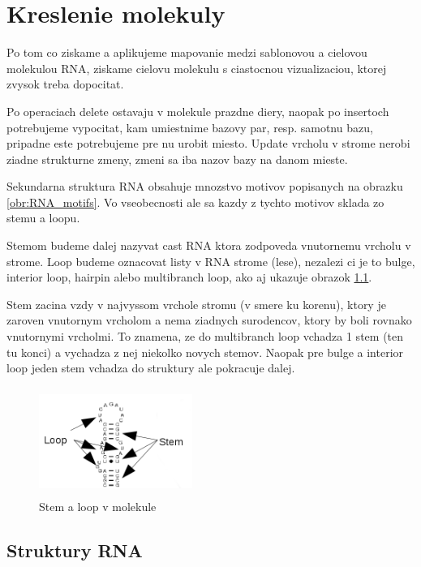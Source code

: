 
\newcommand{\degree}{\ensuremath{^{\circ}}}

\chapter{Kreslenie molekuly}

Po tom co ziskame a aplikujeme mapovanie medzi sablonovou a cielovou molekulou RNA,
ziskame cielovu molekulu s ciastocnou vizualizaciou, ktorej zvysok treba dopocitat.

Po operaciach delete ostavaju v molekule prazdne diery, naopak po insertoch potrebujeme
vypocitat, kam umiestnime bazovy par, resp. samotnu bazu, pripadne este potrebujeme pre
nu urobit miesto. Update vrcholu v strome nerobi ziadne strukturne zmeny, zmeni sa iba
nazov bazy na danom mieste.

Sekundarna struktura RNA obsahuje mnozstvo motivov popisanych na obrazku \ref{obr:RNA_motifs}.
Vo vseobecnosti ale sa kazdy z tychto motivov sklada zo stemu a loopu.

Stemom budeme dalej nazyvat cast RNA ktora zodpoveda vnutornemu vrcholu v strome. Loop
budeme oznacovat listy v RNA strome (lese), nezalezi ci je to bulge, interior loop, hairpin
alebo multibranch loop, ako aj ukazuje obrazok \ref{obr:RNA_motifs_stem_loop}.

Stem zacina vzdy v najvyssom vrchole stromu (v smere ku korenu), ktory je zaroven vnutornym
vrcholom a nema ziadnych surodencov, ktory by boli rovnako vnutornymi vrcholmi.
To znamena, ze do multibranch loop vchadza 1 stem (ten tu konci) a vychadza z nej niekolko novych stemov.
Naopak pre bulge a interior loop jeden stem vchadza do struktury ale pokracuje dalej.

\begin{figure}[H]
\centering
\includegraphics[width=50mm, height=35mm]{../img/struktury_v_rna-stem_loop.png}
\caption{Stem a loop v molekule}
\label{obr:RNA_motifs_stem_loop}
\end{figure}

\section{Struktury RNA}

